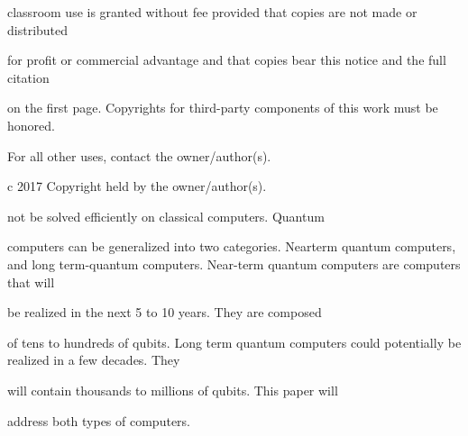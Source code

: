 \documentclass[a4paper,portrait,12pt]{article}
\begin{document}
\begin{flushleft}
classroom use is granted without fee provided that copies are not made or distributed
\end{flushleft}


\begin{flushleft}
for profit or commercial advantage and that copies bear this notice and the full citation
\end{flushleft}


\begin{flushleft}
on the first page. Copyrights for third-party components of this work must be honored.
\end{flushleft}


\begin{flushleft}
For all other uses, contact the owner/author(s).
\end{flushleft}


\begin{flushleft}
c 2017 Copyright held by the owner/author(s).
\end{flushleft}








\begin{flushleft}
not be solved efficiently on classical computers. Quantum
\end{flushleft}


\begin{flushleft}
computers can be generalized into two categories. Nearterm quantum computers, and long term-quantum computers. Near-term quantum computers are computers that will
\end{flushleft}


\begin{flushleft}
be realized in the next 5 to 10 years. They are composed
\end{flushleft}


\begin{flushleft}
of tens to hundreds of qubits. Long term quantum computers could potentially be realized in a few decades. They
\end{flushleft}


\begin{flushleft}
will contain thousands to millions of qubits. This paper will
\end{flushleft}


\begin{flushleft}
address both types of computers.
\end{flushleft}
\end{document}
